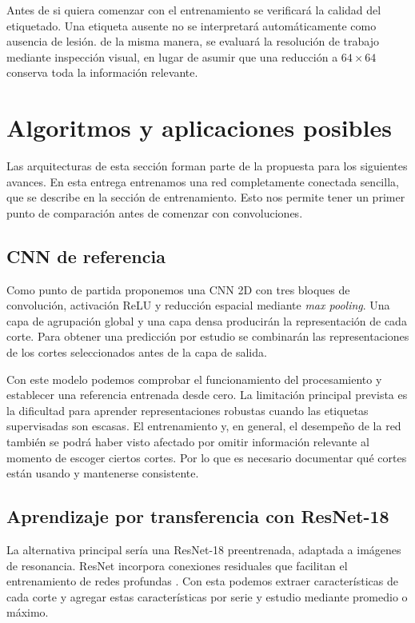 \documentclass[eng]{ajceam-class}
\begin{document}
Antes de si quiera comenzar con el entrenamiento se verificará la calidad del etiquetado. Una etiqueta ausente no se interpretará automáticamente como ausencia de lesión. de la misma manera, se evaluará la resolución de trabajo mediante inspección visual, en lugar de asumir que una reducción a $64\times64$ conserva toda la información relevante.

\section{Algoritmos y aplicaciones posibles}

Las arquitecturas de esta sección forman parte de la propuesta para los siguientes avances. En esta entrega entrenamos una red completamente conectada sencilla, que se describe en la sección de entrenamiento. Esto nos permite tener un primer punto de comparación antes de comenzar con convoluciones.

\subsection{CNN de referencia}

Como punto de partida proponemos una CNN 2D con tres bloques de convolución, activación ReLU y reducción espacial mediante \textit{max pooling}. Una capa de agrupación global y una capa densa producirán la representación de cada corte. Para obtener una predicción por estudio se combinarán las representaciones de los cortes seleccionados antes de la capa de salida.

Con este modelo podemos comprobar el funcionamiento del procesamiento y establecer una referencia entrenada desde cero. La limitación principal prevista es la dificultad para aprender representaciones robustas cuando las etiquetas supervisadas son escasas. El entrenamiento y, en general, el desempeño de la red también se podrá haber visto afectado por omitir información relevante al momento de escoger ciertos cortes. Por lo que es necesario documentar qué cortes están usando y mantenerse consistente.

\subsection{Aprendizaje por transferencia con ResNet-18}

La alternativa principal sería una ResNet-18 preentrenada, adaptada a imágenes de resonancia. ResNet incorpora conexiones residuales que facilitan el entrenamiento de redes profundas \cite{he2016}. Con esta podemos extraer características de cada corte y agregar estas características por serie y estudio mediante promedio o máximo.
\end{document}
